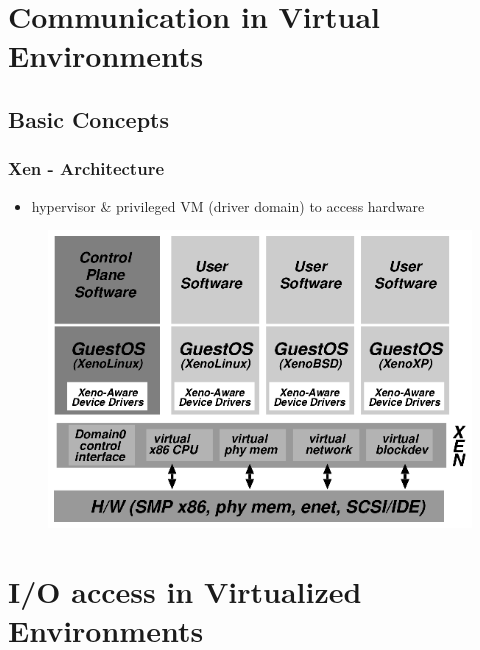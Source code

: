 \documentclass[red,slidestop,notes,compress,mathserif]{beamer}
\begin{document}
\section{Communication in Virtual Environments}

\subsection{Basic Concepts}

\begin{frame}
\frametitle{Xen - Architecture}
\begin{itemize}
\item hypervisor \& privileged VM (driver domain) to access hardware
\end{itemize}
\begin{figure}
\center
\includegraphics{figures/xen_arch.eps}
\end{figure}
\end{frame}

\section{I/O access in Virtualized Environments}
\end{document}
